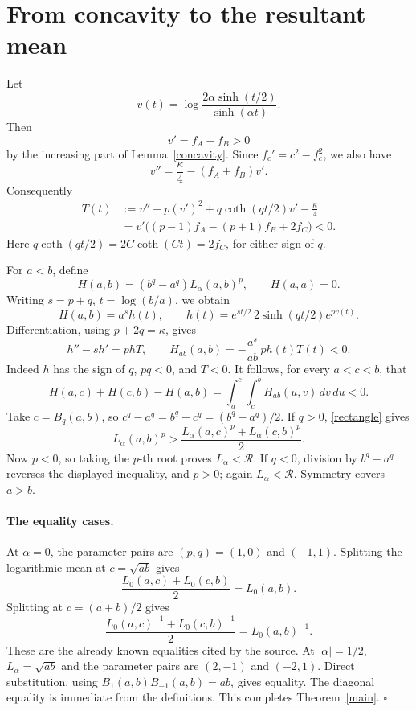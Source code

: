 \documentclass[11pt]{article}
\newcommand{\R}{\mathcal R}
\begin{document}
\section*{From concavity to the resultant mean}
Let
\[
 v(t)=\log\frac{2\alpha\sinh(t/2)}{\sinh(\alpha t)}.
\]
Then
\[
 v'=f_A-f_B>0
\]
by the increasing part of Lemma~\ref{concavity}.
Since \(f_c'=c^2-f_c^2\), we also have
\[
 v''=\frac\kappa4-(f_A+f_B)v'.
\]
Consequently
\begin{align}
 T(t)&:=v''+p(v')^2+q\coth(qt/2)v'-\frac\kappa4
       \nonumber\\
 &=v'\bigl((p-1)f_A-(p+1)f_B+2f_C\bigr)<0.
 \label{T}
\end{align}
Here \(q\coth(qt/2)=2C\coth(Ct)=2f_C\), for either sign of \(q\).

For \(a<b\), define
\[
 H(a,b)=(b^q-a^q)L_\alpha(a,b)^p,\qquad H(a,a)=0.
\]
Writing \(s=p+q\), \(t=\log(b/a)\), we obtain
\[
 H(a,b)=a^s h(t),\qquad
 h(t)=e^{st/2}\,2\sinh(qt/2)e^{pv(t)}.
\]
Differentiation, using \(p+2q=\kappa\), gives
\[
 h''-s h'=p hT,\qquad
 H_{ab}(a,b)=-\frac{a^s}{ab}\,p h(t)T(t)<0.
\]
Indeed \(h\) has the sign of \(q\), \(pq<0\), and \(T<0\).
It follows, for every \(a<c<b\), that
\begin{equation}\label{rectangle}
 H(a,c)+H(c,b)-H(a,b)
   =\int_a^c\int_c^b H_{ab}(u,v)\,dv\,du<0.
\end{equation}
Take \(c=B_q(a,b)\), so
\(c^q-a^q=b^q-c^q=(b^q-a^q)/2\).
If \(q>0\), \eqref{rectangle} gives
\[
 L_\alpha(a,b)^p>
     \frac{L_\alpha(a,c)^p+L_\alpha(c,b)^p}{2}.
\]
Now \(p<0\), so taking the \(p\)-th root proves \(L_\alpha<\R\).
If \(q<0\), division by \(b^q-a^q\) reverses the displayed
inequality, and \(p>0\); again \(L_\alpha<\R\).
Symmetry covers \(a>b\).

\paragraph{The equality cases.}
At \(\alpha=0\), the parameter pairs are \((p,q)=(1,0)\) and
\((-1,1)\). Splitting the logarithmic mean at \(c=\sqrt{ab}\) gives
\[
 \frac{L_0(a,c)+L_0(c,b)}2=L_0(a,b).
\]
Splitting at \(c=(a+b)/2\) gives
\[
 \frac{L_0(a,c)^{-1}+L_0(c,b)^{-1}}2=L_0(a,b)^{-1}.
\]
These are the already known equalities cited by the source.
At \(|\alpha|=1/2\), \(L_\alpha=\sqrt{ab}\) and the parameter pairs
are \((2,-1)\) and \((-2,1)\). Direct substitution, using
\(B_1(a,b)B_{-1}(a,b)=ab\), gives equality.
The diagonal equality is immediate from the definitions.
This completes Theorem~\ref{main}. \(\square\)
\end{document}
